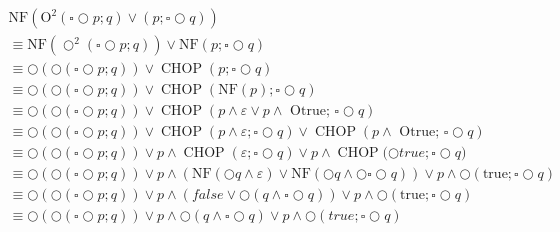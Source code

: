 $\begin{array}{l}{\mathrm{NF}\left(\mathrm{O}^{2}(\square \bigcirc p ; q) \vee(p ; \square \bigcirc q)\right)} \\

\equiv \mathrm{NF}\left(\bigcirc^{2}(\square \bigcirc p ; q)\right) \vee \mathrm{NF}(p ; \square \bigcirc q) \\

\equiv \bigcirc(\bigcirc(\square \bigcirc p ; q)) \vee \operatorname{CHOP}(p ; \square \bigcirc q) \\

\equiv \bigcirc(\bigcirc(\square \bigcirc p ; q)) \vee \operatorname{CHOP}(\mathrm{NF}(p) ; \square \bigcirc q) \\

\equiv \bigcirc(\bigcirc(\square \bigcirc p ; q)) \vee \operatorname{CHOP}(p \wedge \varepsilon \vee p \wedge \text { Otrue; } \square \bigcirc q) \\

\equiv \bigcirc(\bigcirc(\square \bigcirc p ; q)) \vee \operatorname{CHOP}(p \wedge \varepsilon ; \square \bigcirc q) \vee \operatorname{CHOP}(p \wedge \text { Otrue; } \square \bigcirc q) \\

\equiv \bigcirc(\bigcirc(\square \bigcirc p ; q)) \vee p \wedge \operatorname{CHOP}(\varepsilon ; \square \bigcirc q) \vee p \wedge { \operatorname{CHOP}(\bigcirc true;} \square \bigcirc q ) \\

\equiv \bigcirc(\bigcirc(\square \bigcirc p ; q)) \vee p \wedge(\mathrm{NF}(\bigcirc q \wedge \varepsilon) \vee \mathrm{NF}(\bigcirc q \wedge \bigcirc \square \bigcirc q)) \vee p \wedge \bigcirc(\text {true} ; \square \bigcirc q) \\

{\equiv \bigcirc(\bigcirc(\square \bigcirc p ; q)) \vee p \wedge(f a l s e \vee \bigcirc(q \wedge \square \bigcirc q)) \vee p \wedge \bigcirc(\text {true} ; \square \bigcirc q)} \\ {\equiv \bigcirc(\bigcirc(\square \bigcirc p ; q)) \vee p \wedge \bigcirc(q \wedge \square \bigcirc q) \vee p \wedge \bigcirc(t r u e ; \square \bigcirc q)}
\end{array}$










